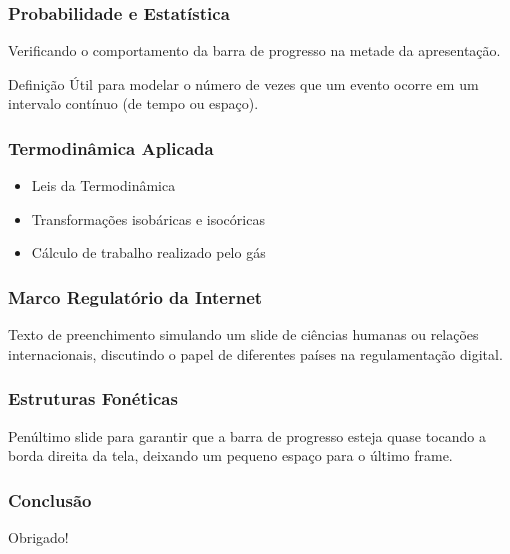 \documentclass[aspectratio=169]{beamer}
\begin{document}
\begin{frame}
    \frametitle{Probabilidade e Estatística}

    Verificando o comportamento da barra de progresso na metade da apresentação.
    \vspace{0.5cm}
    
    \begin{block}{Definição}
        Útil para modelar o número de vezes que um evento ocorre em um intervalo contínuo (de tempo ou espaço).
    \end{block}
\end{frame}

\begin{frame}
    \frametitle{Termodinâmica Aplicada}

    \begin{itemize}
        \item Leis da Termodinâmica
        \item Transformações isobáricas e isocóricas
        \item Cálculo de trabalho realizado pelo gás
    \end{itemize}
\end{frame}

\begin{frame}
    \frametitle{Marco Regulatório da Internet}

    Texto de preenchimento simulando um slide de ciências humanas ou relações internacionais, discutindo o papel de diferentes países na regulamentação digital.
\end{frame}

\begin{frame}
    \frametitle{Estruturas Fonéticas}

    Penúltimo slide para garantir que a barra de progresso esteja quase tocando a borda direita da tela, deixando um pequeno espaço para o último frame.
\end{frame}

\begin{frame}
    \frametitle{Conclusão}

    Obrigado!
\end{frame}
\end{document}
